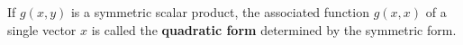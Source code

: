 If $g(x, y)$ is a symmetric scalar product, the associated function $g(x, x)$ of a single vector $x$ is called the \textbf{quadratic form} determined by the symmetric form.
